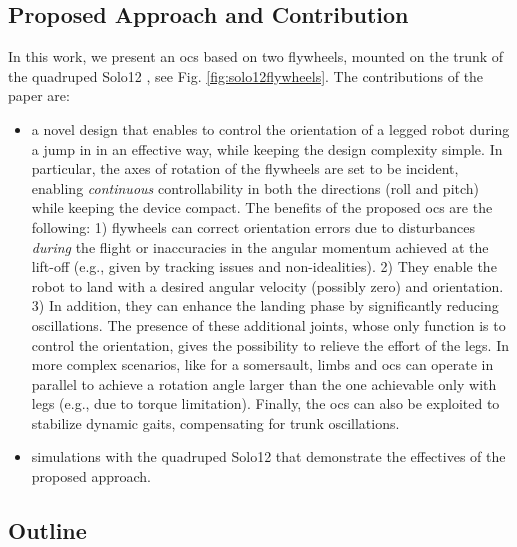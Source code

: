 \documentclass[letterpaper, 10 pt, conference]{ieeeconf}  %
\begin{document}
\subsection{Proposed Approach and Contribution}
In this work, we present an \gls{ocs} based on two flywheels,  mounted on the trunk of the quadruped Solo12 \cite{grimminger2020open}, see Fig. \ref{fig:solo12flywheels}. 
The  contributions of the paper are:
\begin{itemize}
	\item a novel design that enables to control the orientation of a legged robot during a jump in in an effective way, while keeping the design complexity simple. 
	In particular,  the axes of rotation of the flywheels are set to be incident, enabling \textit{continuous} controllability in both the directions (roll and pitch) while keeping the  device compact.
	The benefits of the proposed \gls{ocs} are the following: 1) flywheels can correct orientation errors due to disturbances \textit{during} 
	the flight or inaccuracies in the angular momentum achieved at the lift-off (e.g., given by tracking issues and non-idealities). 
	2) They enable the robot to land with a desired angular velocity (possibly zero) and orientation.
3) In addition, they can enhance the landing phase by significantly reducing oscillations.  
The presence of these additional joints, whose only function is to control the orientation, gives the possibility to relieve the effort of the legs.
In more complex scenarios, like for a somersault, limbs and \gls{ocs} can operate in parallel to achieve a rotation angle larger than the one achievable only with legs (e.g., due to torque limitation). 
Finally, the \gls{ocs} can also be exploited to stabilize dynamic gaits, compensating for trunk oscillations.
	\item simulations  with the quadruped Solo12 that demonstrate the effectives of the proposed approach.
\end{itemize}



\subsection{Outline}
\lipsum[1]
% 
\end{document}
